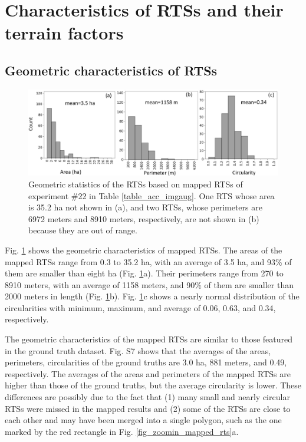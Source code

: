\documentclass[authoryear,preprint,review,12pt]{elsarticle}
\begin{document}
\section{Characteristics of RTSs and their terrain factors}
\label{sec_spatial_terrain}


\subsection{Geometric characteristics of RTSs}
\label{subsec_geo_charac}

\begin{figure}
	\centering
	\includegraphics[width=14cm]{figures/geometric_var_mapped_trim.jpg}
	\caption{Geometric statistics of the RTSs based on mapped RTSs of experiment \#22 in Table \ref{table_acc_imgaug}. One RTS whose area is 35.2 ha not shown in (a), and two RTSs, whose perimeters are 6972 meters and 8910 meters, respectively, are not shown in (b) because they are out of range. }
	\label{fig_geometric_statistics}
\end{figure}


Fig. \ref{fig_geometric_statistics} shows the geometric characteristics of mapped RTSs.  The areas of the mapped RTSs range from 0.3 to 35.2 ha, with an average of 3.5 ha, and 93\% of them are smaller than eight ha (Fig. \ref{fig_geometric_statistics}a). Their perimeters range from 270 to 8910 meters, with an average of 1158 meters, and 90\% of them are smaller than 2000 meters in length (Fig. \ref{fig_geometric_statistics}b). Fig. \ref{fig_geometric_statistics}c shows a nearly normal distribution of the circularities with minimum, maximum, and average of 0.06, 0.63, and 0.34, respectively. 

The geometric characteristics of the mapped RTSs are similar to those featured in the ground truth dataset. Fig. S7 shows that the averages of the areas, perimeters, circularities of the ground truths 
 are 3.0 ha, 881 meters, and 0.49, respectively. The averages of the areas and perimeters of the mapped RTSs are higher than those of the ground truths, but the average circularity is lower. These differences are possibly due to the fact that (1) many small and nearly circular RTSs were missed in the mapped results and (2) some of the RTSs are close to each other and may have been merged into a single polygon, such as the one marked by the red rectangle in Fig. \ref{fig_zoomin_mapped_rts}a.  
\end{document}
